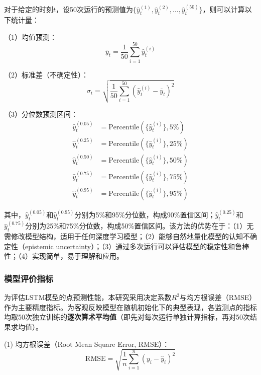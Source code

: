 \documentclass[12pt,a4paper]{article}
\begin{document}
对于给定的时刻$t$，设50次运行的预测值为$\{\hat{y}_t^{(1)}, \hat{y}_t^{(2)}, \ldots, \hat{y}_t^{(50)}\}$，则可以计算以下统计量：

（1）均值预测：
\begin{equation}
\bar{y}_t = \frac{1}{50}\sum_{i=1}^{50}\hat{y}_t^{(i)}
\label{eq:mean-prediction}
\end{equation}

（2）标准差（不确定性）：
\begin{equation}
\sigma_t = \sqrt{\frac{1}{50}\sum_{i=1}^{50}(\hat{y}_t^{(i)} - \bar{y}_t)^2}
\label{eq:std-prediction}
\end{equation}

（3）分位数预测区间：
\begin{equation}
\begin{aligned}
\hat{y}_t^{(0.05)} &= \text{Percentile}(\{\hat{y}_t^{(i)}\}, 5\%) \\
\hat{y}_t^{(0.25)} &= \text{Percentile}(\{\hat{y}_t^{(i)}\}, 25\%) \\
\hat{y}_t^{(0.50)} &= \text{Percentile}(\{\hat{y}_t^{(i)}\}, 50\%) \\
\hat{y}_t^{(0.75)} &= \text{Percentile}(\{\hat{y}_t^{(i)}\}, 75\%) \\
\hat{y}_t^{(0.95)} &= \text{Percentile}(\{\hat{y}_t^{(i)}\}, 95\%)
\end{aligned}
\label{eq:percentile-prediction}
\end{equation}

其中，$\hat{y}_t^{(0.05)}$和$\hat{y}_t^{(0.95)}$分别为5\%和95\%分位数，构成90\%置信区间；$\hat{y}_t^{(0.25)}$和$\hat{y}_t^{(0.75)}$分别为25\%和75\%分位数，构成50\%置信区间。该方法的优势在于：（1）无需修改模型结构，适用于任何深度学习模型；（2）能够自然地量化模型的认知不确定性（epistemic uncertainty）；（3）通过多次运行可以评估模型的稳定性和鲁棒性；（4）实现简单，易于理解和应用。

\subsubsection{模型评价指标}

为评估LSTM模型的点预测性能，本研究采用决定系数$R^2$与均方根误差（RMSE）作为主要精度指标。为客观反映模型在随机初始化下的典型表现，各监测点的指标均取50次独立训练的\textbf{逐次算术平均值}（即先对每次运行单独计算指标，再对50次结果求均值）。

(1) 均方根误差（Root Mean Square Error, RMSE）：
\begin{equation}
\text{RMSE} = \sqrt{\frac{1}{n}\sum_{i=1}^{n}(y_i - \hat{y}_i)^2}
\label{eq:rmse}
\end{equation}
\end{document}
